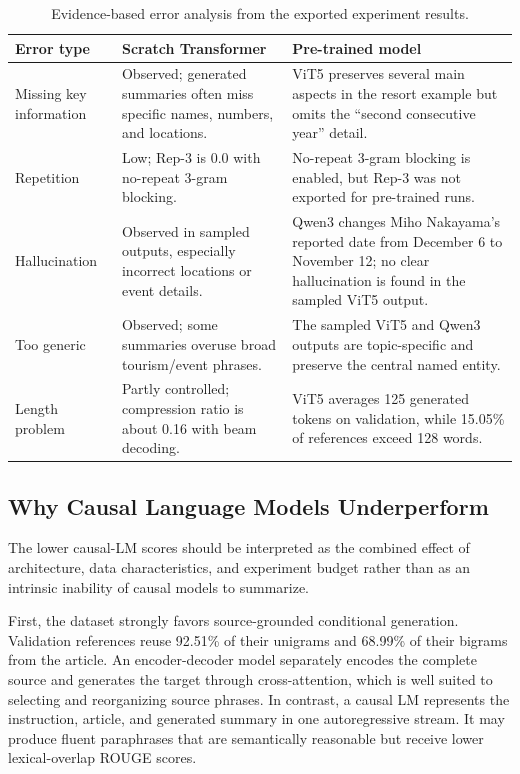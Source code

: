 \documentclass[conference]{IEEEtran}
\begin{document}
\begin{table}[htbp]
\centering
\caption{Evidence-based error analysis from the exported experiment results.}
\label{tab:error_analysis}
\begin{tabular}{lp{}p{}}
\toprule
Error type & Scratch Transformer & Pre-trained model \\
\midrule
Missing key information & Observed; generated summaries often miss specific names, numbers, and locations. & ViT5 preserves several main aspects in the resort example but omits the ``second consecutive year'' detail. \\
Repetition & Low; Rep-3 is 0.0 with no-repeat 3-gram blocking. & No-repeat 3-gram blocking is enabled, but Rep-3 was not exported for pre-trained runs. \\
Hallucination & Observed in sampled outputs, especially incorrect locations or event details. & Qwen3 changes Miho Nakayama's reported date from December 6 to November 12; no clear hallucination is found in the sampled ViT5 output. \\
Too generic & Observed; some summaries overuse broad tourism/event phrases. & The sampled ViT5 and Qwen3 outputs are topic-specific and preserve the central named entity. \\
Length problem & Partly controlled; compression ratio is about 0.16 with beam decoding. & ViT5 averages 125 generated tokens on validation, while 15.05\% of references exceed 128 words. \\
\bottomrule
\end{tabular}
\end{table}

\subsection{Why Causal Language Models Underperform}
The lower causal-LM scores should be interpreted as the combined effect of architecture, data characteristics, and experiment budget rather than as an intrinsic inability of causal models to summarize.

First, the dataset strongly favors source-grounded conditional generation. Validation references reuse 92.51\% of their unigrams and 68.99\% of their bigrams from the article. An encoder-decoder model separately encodes the complete source and generates the target through cross-attention, which is well suited to selecting and reorganizing source phrases. In contrast, a causal LM represents the instruction, article, and generated summary in one autoregressive stream. It may produce fluent paraphrases that are semantically reasonable but receive lower lexical-overlap ROUGE scores.
\end{document}
